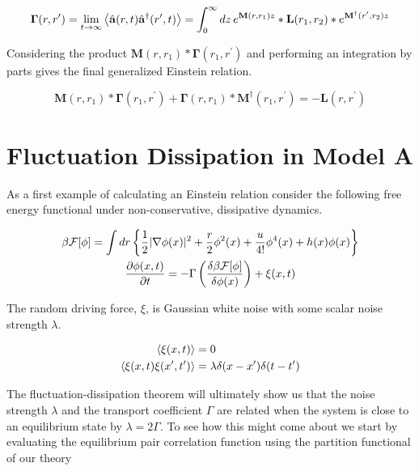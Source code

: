 \begin{equation}
	\mathbf{\Gamma}(r, r^\prime) = \lim_{t\rightarrow\infty} \left\langle \hat{\mathbf{a}}(r, t)\hat{\mathbf{a}}^\dagger(r^\prime, t) \right\rangle =
	\int_0^\infty dz \,e^{\mathbf{M}(r, r_1)z}\ast\mathbf{L}(r_1, r_2)\ast e^{\mathbf{M}^\dagger(r^\prime, r_2)z}
\end{equation}

Considering the product $\mathbf{M}(r, r_1)\ast\mathbf{\Gamma}(r_1, r^\prime)$ and performing an integration by parts gives the final generalized Einstein relation.

\begin{equation}
	\mathbf{M}(r, r_1)\ast\mathbf{\Gamma}(r_1, r^\prime) + \mathbf{\Gamma}(r, r_1)\ast\mathbf{M}^\dagger(r_1, r^\prime) = -\mathbf{L}(r, r^\prime)
\end{equation}

\section{Fluctuation Dissipation in Model A}

As a first example of calculating an Einstein relation consider the following free energy functional under non-conservative, dissipative dynamics.

\begin{gather}
\beta \mathcal{F}[\phi] = \int dr \left\lbrace \frac{1}{2}\vert \nabla \phi(x) \vert^2 + \frac{r}{2}\phi^2(x) + \frac{u}{4!}\phi^4(x)  + h(x)\phi(x)\right\rbrace \\
\frac{\partial \phi(x,t)}{\partial t} = -\Gamma \left(\frac{\delta \beta \mathcal{F}[\phi]}{\delta \phi(x)}\right) + \xi(x, t)
\end{gather}

The random driving force, $\xi$, is Gaussian white noise with some scalar noise strength $\lambda$.

\begin{align}
\left\langle \xi (x, t) \right\rangle &= 0 \\
\left\langle \xi (x, t) \xi(x^\prime, t^\prime) \right\rangle  &= \lambda \delta(x - x^\prime) \delta (t - t^\prime)
\end{align}

The fluctuation-dissipation theorem will ultimately show us that the noise strength $\lambda$ and the transport coefficient $\Gamma$ are related when the system is close to an equilibrium state by $\lambda = 2\Gamma$. To see how this might come about we start by evaluating the equilibrium pair correlation function using the partition functional of our theory

